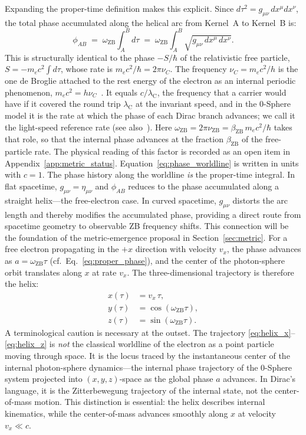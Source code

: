 \documentclass[%
 reprint, amsmath,amssymb, aps, prb, ]{revtex4-2}
\numberwithin{equation}{section}
\newcommand{\omZB}{\omega_{\text{ZB}}}
\newcommand{\lambdaC}{\lambda_{\mathrm{C}}}
\begin{document}
Expanding the proper-time definition makes this explicit. Since $d\tau^2 = g_{\mu\nu}\,dx^\mu dx^\nu$, the total phase accumulated along the helical arc from Kernel~A to Kernel~B is:
\begin{equation}
\phi_{AB} \;=\; \omZB \int_{A}^{B} d\tau \;=\; \omZB \int_{A}^{B} \sqrt{g_{\mu\nu}\,dx^\mu\,dx^\nu}.
\label{eq:phase_worldline}
\end{equation}
This is structurally identical to the phase $-S/\hbar$ of the relativistic free particle, $S = -m_ec^2\int d\tau$, whose rate is $m_ec^2/\hbar = 2\pi\nu_C$. The frequency $\nu_C = m_ec^2/h$ is the one de Broglie attached to the rest energy of the electron as an internal periodic phenomenon, $m_ec^2 = h\nu_C$~\cite{deBroglie1925, Yukawa1954}. It equals $c/\lambdaC$, the frequency that a carrier would have if it covered the round trip $\lambdaC$ at the invariant speed, and in the 0-Sphere model it is the rate at which the phase of each Dirac branch advances; we call it the light-speed reference rate (see also~\cite{hanamura65, hanamura66}). Here $\omZB = 2\pi\nu_{\mathrm{ZB}} = \beta_{\mathrm{ZB}}\,m_ec^2/\hbar$ takes that role, so that the internal phase advances at the fraction $\beta_{\mathrm{ZB}}$ of the free-particle rate. The physical reading of this factor is recorded as an open item in Appendix~\ref{app:metric_status}. Equation~\eqref{eq:phase_worldline} is written in units with $c = 1$. The phase history along the worldline \emph{is} the proper-time integral. In flat spacetime, $g_{\mu\nu} = \eta_{\mu\nu}$ and $\phi_{AB}$ reduces to the phase accumulated along a straight helix---the free-electron case. In curved spacetime, $g_{\mu\nu}$ distorts the arc length and thereby modifies the accumulated phase, providing a direct route from spacetime geometry to observable ZB frequency shifts. This connection will be the foundation of the metric-emergence proposal in Section~\ref{sec:metric}. For a free electron propagating in the $+x$ direction with velocity $v_x$, the phase advances as $a = \omZB \tau$ (cf.\ Eq.~\eqref{eq:proper_phase}), and the center of the photon-sphere orbit translates along $x$ at rate $v_x$. The three-dimensional trajectory is therefore the helix:
\begin{align}
x(\tau) &= v_x\, \tau, \label{eq:helix_x}\\
y(\tau) &= \cos(\omZB \tau), \label{eq:helix_y}\\
z(\tau) &= \sin(\omZB \tau). \label{eq:helix_z}
\end{align}
A terminological caution is necessary at the outset. The trajectory \eqref{eq:helix_x}--\eqref{eq:helix_z} is \emph{not} the classical worldline of the electron as a point particle moving through space. It is the locus traced by the instantaneous center of the internal photon-sphere dynamics---the internal phase trajectory of the 0-Sphere system projected into $(x,y,z)$-space as the global phase $a$ advances. In Dirac's language, it is the Zitterbewegung trajectory of the internal state, not the center-of-mass motion. This distinction is essential: the helix describes internal kinematics, while the center-of-mass advances smoothly along $x$ at velocity $v_x \ll c$.
\end{document}
